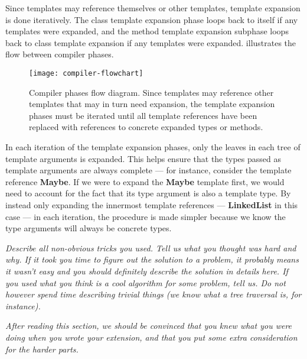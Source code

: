 Since templates may reference themselves or other templates, template expansion is done iteratively.
The class template expansion phase loops back to itself if any templates were expanded, and the
method template expansion subphase loops back to class template expansion if any templates were
expanded.  illustrates the flow between compiler phases.

\begin{figure}[hbtp]
  \texttt{[image: compiler-flowchart]}
  \caption{Compiler phases flow diagram. Since templates may reference other templates that may in
    turn need expansion, the template expansion phases must be iterated until all template
    references have been replaced with references to concrete expanded types or methods.}
  \label{fig:compiler-flowchart}
\end{figure}

In each iteration of the template expansion phases, only the leaves in each tree of template
arguments is expanded. This helps ensure that the types passed as template arguments are always
complete --- for instance, consider the template reference
\textbf{Maybe}. If we were to expand the \textbf{Maybe} template first,
we would need to account for the fact that its type argument is also a template type. By instead
only expanding the innermost template references --- \textbf{LinkedList} in this case ---
in each iteration, the procedure is made simpler because we know the type arguments will always be
concrete types.


\emph{Describe all non-obvious tricks you used. Tell us what you thought was hard and
why. If it took you time to figure out the solution to a problem, it probably
means it wasn't easy and you should definitely describe the solution in details
here. If you used what you think is a cool algorithm for some problem, tell us.
Do not however spend time describing trivial things (we know what a tree traversal
is, for instance).}

\emph{After reading this section, we should be convinced that you knew what you were
doing when you wrote your extension, and that you put some extra consideration
for the harder parts.}
